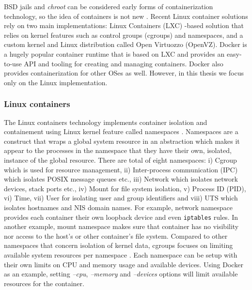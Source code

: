 \documentclass[english,12pt,a4paper,pdftex,sci,utf8]{aaltothesis}
\begin{document}
BSD jails and \textit{chroot} can be considered early forms of containerization technology, so the idea of containers is not new \cite{combe2016docker}. Recent Linux container solutions rely on two main implementations: Linux Containers (LXC) -based solution that relies on kernel features such as control groups (cgroups) and namespaces, and a custom kernel and Linux distribution called Open Virtuozzo (OpenVZ). Docker \cite{docker} is a hugely popular container runtime that is based on LXC and provides an easy-to-use API and tooling for creating and managing containers. Docker also provides containerization for other OSes as well. However, in this thesis we focus only on the Linux implementation.

\subsubsection{Linux containers}

The Linux containers technology implements container isolation and containement using Linux kernel feature called namespaces \cite{lin2018measurement}. Namespaces \cite{manpages-namespace} are a construct that wraps a global system resource in an abstraction which makes it appear to the processes in the namespace that they have their own, isolated, instance of the global resource. There are total of eight namespaces: i) Cgroup which is used for resource management, ii) Inter-process communication (IPC) which isolates POSIX message queues etc., iii) Network which isolates network devices, stack ports etc., iv) Mount for file system isolation, v) Process ID (PID), vi) Time, vii) User for isolating user and group identifiers and viii) UTS which isolates hostnames and NIS domain names. For example, network namespace provides each container their own loopback device and even \texttt{iptables} rules. In another example, mount namespace makes sure that container has no visibility nor access to the host's or other container's file system. Compared to other namespaces that concern isolation of kernel data, cgroups focuses on limiting available system resources per namespace \cite{lin2018measurement}. Each namespace can be setup with their own limits on CPU and memory usage and available devices. Using Docker as an example, setting \textit{--cpu}, \textit{--memory} and \textit{--devices} options will limit available resources for the container.
\end{document}
